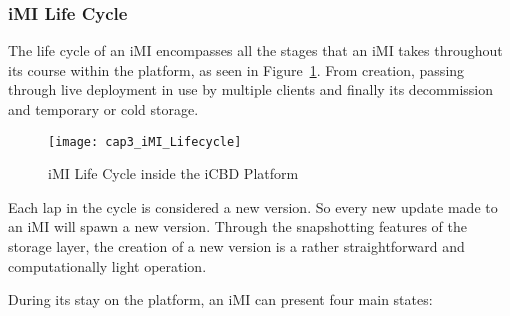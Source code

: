 \subsubsection{iMI Life Cycle}
\label{subsub:imi_lifecycle}
The life cycle of an iMI encompasses all the stages that an iMI takes throughout its course within the platform, as seen in Figure~\ref{fig:icbd_iMI_lifecycle}. From creation, passing through live deployment in use by multiple clients and finally its decommission and temporary or cold storage.

\begin{figure}[htbp]
	\centering
	\texttt{[image: cap3\_iMI\_Lifecycle]}
	\caption{iMI Life Cycle inside the iCBD Platform}
	\label{fig:icbd_iMI_lifecycle}
\end{figure}

Each lap in the cycle is considered a new version. So every new update made to an iMI will spawn a new version. Through the snapshotting features of the storage layer, the creation of a new version is a rather straightforward and computationally light operation.

During its stay on the platform, an iMI can present four main states:

